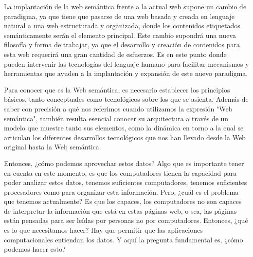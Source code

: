 La implantación de la web semántica frente a la actual web supone un cambio de paradigma, ya que tiene que pasarse de una web basada y creada en lenguaje natural a una web estructurada y organizada, donde los contenidos etiquetados semánticamente serán el elemento principal. Este cambio supondrá una nueva filosofía y forma de trabajar, ya que el desarrollo y creación de contenidos para esta web requerirá una gran cantidad de esfuerzos. Es en este punto donde pueden intervenir las tecnologías del lenguaje humano para facilitar mecanismos y herramientas que ayuden a la implantación y expansión de este nuevo paradigma.


Para conocer que es la Web semántica, es necesario establecer los principios básicos, tanto conceptuales como tecnológicos sobre los que se asienta. Además de saber con precisión a qué nos referimos cuando utilizamos la expresión "Web semántica", también resulta esencial conocer su arquitectura a través de un modelo que muestre tanto sus elementos, como la dinámica en torno a la cual se articulan los diferentes desarrollos tecnológicos que nos han llevado desde la Web original hasta la Web semántica.

Entonces, ¿cómo podemos aprovechar estos datos? Algo que es importante tener en cuenta en este momento, es que los computadores tienen la capacidad para poder analizar estos datos, tenemos suficientes computadores, tenemos suficientes procesadores como para organizar esta información. Pero, ¿cuál es el problema que tenemos actualmente? Es que los capaces, los computadores no son capaces de interpretar la información que está en estas páginas web, o sea, las páginas están pensadas para ser leídas por personas no por computadores. Entonces, ¿qué es lo que necesitamos hacer? Hay que permitir que las aplicaciones computacionales entiendan los datos. Y aquí la pregunta fundamental es, ¿cómo podemos hacer esto?

